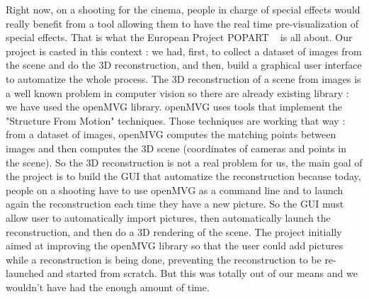 Right now, on a shooting for the cinema, people in charge of special effects would really benefit from a tool 
allowing them to have the real time pre-visualization of special effects. That is what the European Project POPART ~\cite{popart}
is all about. Our project is casted in this context : we had, first, to collect a dataset of images from the scene and do 
the 3D reconstruction, and then, build a graphical user interface to automatize the whole process. 
The 3D reconstruction of a scene from images is a well known problem in computer vision so there are already existing library : we have used the openMVG library. openMVG uses tools that implement the "Structure From Motion"
techniques. Those techniques are working that way : from a dataset of images, openMVG computes the matching points between
images and then computes the 3D scene (coordinates of cameras and points in the scene). So the 3D reconstruction is not a real problem for us, 
the main goal of the project is to build the GUI that automatize the reconstruction because today, people on a 
shooting have to use openMVG as a command line and to launch again the reconstruction each time they have a new picture.
So the GUI must allow user to automatically import pictures, then automatically launch the reconstruction, and then do a
 3D rendering of the scene. The project initially aimed at improving the openMVG library so that the user could add 
pictures while a reconstruction is being done, preventing the reconstruction to be re-launched and started from scratch. But
this was totally out of our means and we wouldn't have had the enough amount of time.